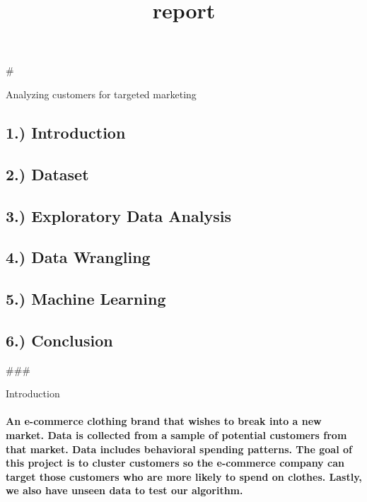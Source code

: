 \documentclass[11pt]{article}
\title{report}
\begin{document}
    
    
    \maketitle
    
    

    
    \#

Analyzing customers for targeted marketing

    \subsection{1.) Introduction}\label{introduction}

\subsection{2.) Dataset}\label{dataset}

\subsection{3.) Exploratory Data
Analysis}\label{exploratory-data-analysis}

\subsection{4.) Data Wrangling}\label{data-wrangling}

\subsection{5.) Machine Learning}\label{machine-learning}

\subsection{6.) Conclusion}\label{conclusion}

    \#\#\#

Introduction

    \paragraph{An e-commerce clothing brand that wishes to break into a new
market. Data is collected from a sample of potential customers from that
market. Data includes behavioral spending patterns. The goal of this
project is to cluster customers so the e-commerce company can target
those customers who are more likely to spend on clothes. Lastly, we also
have unseen data to test our
algorithm.}\label{an-e-commerce-clothing-brand-that-wishes-to-break-into-a-new-market.-data-is-collected-from-a-sample-of-potential-customers-from-that-market.-data-includes-behavioral-spending-patterns.-the-goal-of-this-project-is-to-cluster-customers-so-the-e-commerce-company-can-target-those-customers-who-are-more-likely-to-spend-on-clothes.-lastly-we-also-have-unseen-data-to-test-our-algorithm.}
\end{document}
